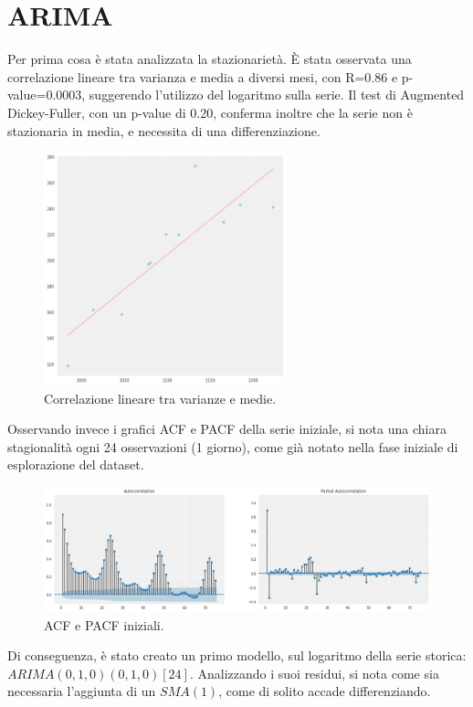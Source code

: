 
\section{ARIMA}

Per prima cosa è stata analizzata la stazionarietà. È stata osservata una correlazione lineare tra varianza e media a diversi mesi, con R=0.86 e p-value=0.0003, suggerendo l'utilizzo del logaritmo sulla serie. Il test di Augmented Dickey-Fuller, con un p-value di 0.20, conferma inoltre che la serie non è stazionaria in media, e necessita di una differenziazione. 

\begin{figure}[H]
\centering
\includegraphics[width=7cm]{Pictures/medie_varianze.png}
\caption{Correlazione lineare tra varianze e medie.}
\end{figure}

Osservando invece i grafici ACF e PACF della serie iniziale, si nota una chiara stagionalità ogni 24 osservazioni (1 giorno), come già notato nella fase iniziale di esplorazione del dataset. 

\begin{figure}[H]
\centering
\includegraphics[width=13cm]{Pictures/acf_pacf_1.png}
\caption{ACF e PACF iniziali.}
\end{figure}

Di conseguenza, è stato creato un primo modello, sul logaritmo della serie storica: $ARIMA (0,1,0) (0,1,0) [24]$. Analizzando i suoi residui, si nota come sia necessaria l'aggiunta di un $SMA(1)$, come di solito accade differenziando. 

